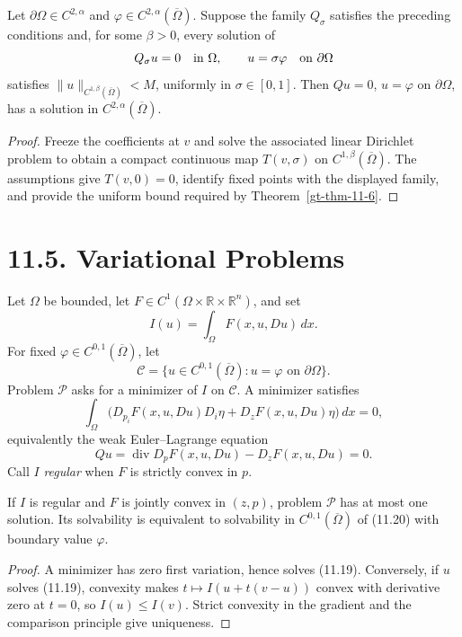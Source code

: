 \begin{theorem}
\label{gt-thm-11-8}
Let $\partial\Omega\in C^{2,\alpha}$ and
$\varphi\in C^{2,\alpha}(\overline\Omega)$. Suppose the family $Q_\sigma$
satisfies the preceding conditions and, for some $\beta>0$, every solution of
\[
Q_\sigma u=0\quad\hbox{in }\Omega,
\qquad u=\sigma\varphi\quad\hbox{on }\partial\Omega
\]
satisfies $\|u\|_{C^{1,\beta}(\overline\Omega)}<M$, uniformly in
$\sigma\in[0,1]$. Then $Qu=0$, $u=\varphi$ on $\partial\Omega$, has a
solution in $C^{2,\alpha}(\overline\Omega)$.
\end{theorem}
\begin{proof}
\sketch Freeze the coefficients at $v$ and solve the associated linear
Dirichlet problem to obtain a compact continuous map
$T(v,\sigma)$ on $C^{1,\beta}(\overline\Omega)$. The assumptions give
$T(v,0)=0$, identify fixed points with the displayed family, and provide the
uniform bound required by Theorem~\ref{gt-thm-11-6}.
\end{proof}

\section*{11.5. Variational Problems}

Let $\Omega$ be bounded, let $F\in C^1(\Omega\times\mathbb R\times\mathbb
R^n)$, and set
\begin{equation}
\tag{11.18}
I(u)=\int_\Omega F(x,u,Du)\,dx.
\end{equation}
For fixed $\varphi\in C^{0,1}(\overline\Omega)$, let
\[
\mathcal C=\{u\in C^{0,1}(\overline\Omega):u=\varphi
\text{ on }\partial\Omega\}.
\]
Problem $\mathcal P$ asks for a minimizer of $I$ on $\mathcal C$. A minimizer
satisfies
\begin{equation}
\tag{11.19}
\int_\Omega\bigl(D_{p_i}F(x,u,Du)D_i\eta+D_zF(x,u,Du)\eta\bigr)\,dx=0,
\end{equation}
equivalently the weak Euler--Lagrange equation
\begin{equation}
\tag{11.20}
Qu=\operatorname{div}D_pF(x,u,Du)-D_zF(x,u,Du)=0.
\end{equation}
Call $I$ \emph{regular} when $F$ is strictly convex in $p$.

\begin{theorem}
\label{gt-thm-11-9}
If $I$ is regular and $F$ is jointly convex in $(z,p)$, problem $\mathcal P$
has at most one solution. Its solvability is equivalent to solvability in
$C^{0,1}(\overline\Omega)$ of (11.20) with boundary value $\varphi$.
\end{theorem}
\begin{proof}
\sketch A minimizer has zero first variation, hence solves (11.19).
Conversely, if $u$ solves (11.19), convexity makes
$t\mapsto I(u+t(v-u))$ convex with derivative zero at $t=0$, so
$I(u)\leq I(v)$. Strict convexity in the gradient and the comparison
principle give uniqueness.
\end{proof}

